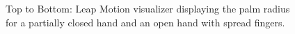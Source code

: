 \documentclass[review]{acmsiggraph}
\begin{document}
\begin{figure}
\centering
{}
\vspace{-0.1cm}
\caption{Top to Bottom: Leap Motion visualizer displaying the palm radius
 for a partially closed hand and an open hand with spread fingers.\label{Palm}}
\vspace{-0.5cm}
\end{figure}
\end{document}

